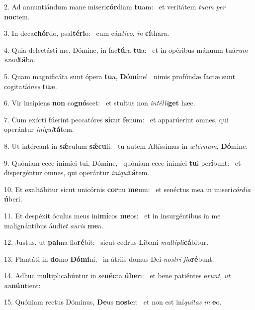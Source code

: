 2. Ad annuntiándum mane miseri\textbf{cór}diam \textbf{tu}am: \ast\  et veritátem \textit{tu}\textit{am} \textit{per} \textbf{noc}tem.\

3. In deca\textbf{chór}do, psal\textbf{té}\textbf{ri}o: \ast\  cum cán\textit{ti}\textit{co}, \textit{in} \textbf{cí}thara.\

4. Quia delectásti me, Dómine, in fac\textbf{tú}ra \textbf{tu}a: \ast\  et in opéribus mánuum tuá\textit{rum} \textit{ex}\textit{sul}\textbf{tá}bo.\

5. Quam magnificáta sunt ópera \textbf{tu}a, \textbf{Dó}\textbf{mi}ne! \ast\  nimis profúndæ factæ sunt cogita\textit{ti}\textit{ó}\textit{nes} \textbf{tu}æ.\

6. Vir insípiens \textbf{non} co\textbf{gnó}scet: \ast\  et stultus non \textit{in}\textit{tél}\textit{li}\textbf{get} hæc.\

7. Cum exórti fúerint peccatóres \textbf{sic}ut \textbf{fe}num: \ast\  et apparúerint omnes, qui operántur \textit{in}\textit{i}\textit{qui}\textbf{tá}tem.\

8. Ut intéreant in \textbf{sǽ}culum \textbf{sǽ}\textbf{cu}li: \ast\  tu autem Altíssimus in \textit{æ}\textit{tér}\textit{num}, \textbf{Dó}mine.\

9. Quóniam ecce inimíci tui, Dómine, \dag\  quóniam ecce inimíci \textbf{tu}i per\textbf{í}bunt: \ast\  et dispergéntur omnes, qui operántur \textit{in}\textit{i}\textit{qui}\textbf{tá}tem.\

10. Et exaltábitur sicut unicórnis \textbf{cor}nu \textbf{me}um: \ast\  et senéctus mea in miseri\textit{cór}\textit{di}\textit{a} \textbf{ú}beri.\

11. Et despéxit óculus meus ini\textbf{mí}cos \textbf{me}os: \ast\  et in insurgéntibus in me malignántibus áudi\textit{et} \textit{au}\textit{ris} \textbf{me}a.\

12. Justus, ut \textbf{pal}ma flo\textbf{ré}bit: \ast\  sicut cedrus Líbani \textit{mul}\textit{ti}\textit{pli}\textbf{cá}bitur.\

13. Plantáti in \textbf{do}mo \textbf{Dó}\textbf{mi}ni, \ast\  in átriis domus Dei \textit{nos}\textit{tri} \textit{flo}\textbf{ré}bunt.\

14. Adhuc multiplicabúntur in se\textbf{néc}ta \textbf{ú}\textbf{be}ri: \ast\  et bene patiéntes e\textit{runt}, \textit{ut} \textit{an}\textbf{nún}tient:\

15. Quóniam rectus Dóminus, \textbf{De}us \textbf{nos}ter: \ast\  et non est iní\textit{qui}\textit{tas} \textit{in} \textbf{e}o.\

